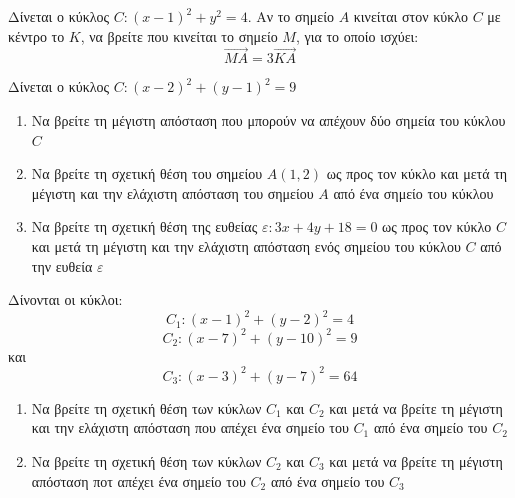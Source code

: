 \documentclass{presentation}
\begin{document}
\begin{askisi}
  Δίνεται ο κύκλος $C:(x-1)^2+y^2=4$. Αν το σημείο $Α$ κινείται στον κύκλο $C$ με κέντρο το $Κ$, να βρείτε που κινείται το σημείο $Μ$, για το οποίο ισχύει:
  $$\overrightarrow{ΜΑ}=3\overrightarrow{ΚΑ}$$

\end{askisi}

\begin{askisi}
  Δίνεται ο κύκλος $C:(x-2)^2+(y-1)^2=9$
  \begin{enumerate}
    \item<1-> Να βρείτε τη μέγιστη απόσταση που μπορούν να απέχουν δύο σημεία του κύκλου $C$
    \item<2-> Να βρείτε τη σχετική θέση του σημείου $Α(1,2)$ ως προς τον κύκλο και μετά τη μέγιστη και την ελάχιστη απόσταση του σημείου $Α$ από ένα σημείο του κύκλου
    \item<3-> Να βρείτε τη σχετική θέση της ευθείας $ε:3x+4y+18=0$ ως προς τον κύκλο $C$ και μετά τη μέγιστη και την ελάχιστη απόσταση ενός σημείου του κύκλου $C$ από την ευθεία $ε$
  \end{enumerate}

\end{askisi}

\begin{askisi}
  Δίνονται οι κύκλοι:
  $$C_1:(x-1)^2+(y-2)^2=4$$
  $$C_2:(x-7)^2+(y-10)^2=9$$
  και
  $$C_3:(x-3)^2+(y-7)^2=64$$
  \begin{enumerate}
    \item<1-> Να βρείτε τη σχετική θέση των κύκλων $C_1$ και $C_2$ και μετά να βρείτε τη μέγιστη και την ελάχιστη απόσταση που απέχει ένα σημείο του $C_1$ από ένα σημείο του $C_2$
    \item<2-> Να βρείτε τη σχετική θέση των κύκλων $C_2$ και $C_3$ και μετά να βρείτε τη μέγιστη απόσταση ποτ απέχει ένα σημείο του $C_2$ από ένα σημείο του $C_3$
  \end{enumerate}

\end{askisi}

\appendix
\end{document}

